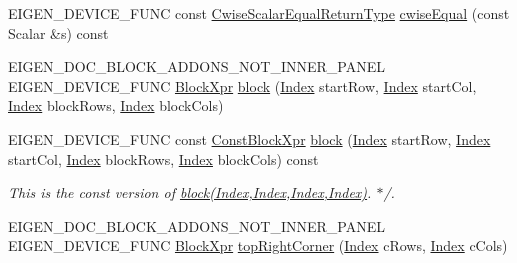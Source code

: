 \begin{DoxyCompactItemize}
\item 
E\+I\+G\+E\+N\+\_\+\+D\+E\+V\+I\+C\+E\+\_\+\+F\+U\+NC const \mbox{\hyperlink{class_eigen_1_1_cwise_binary_op}{Cwise\+Scalar\+Equal\+Return\+Type}} \mbox{\hyperlink{class_eigen_1_1_sparse_matrix_base_af1dcaa7c8574dbc2205319a91d798417}{cwise\+Equal}} (const Scalar \&s) const
\item 
E\+I\+G\+E\+N\+\_\+\+D\+O\+C\+\_\+\+B\+L\+O\+C\+K\+\_\+\+A\+D\+D\+O\+N\+S\+\_\+\+N\+O\+T\+\_\+\+I\+N\+N\+E\+R\+\_\+\+P\+A\+N\+EL E\+I\+G\+E\+N\+\_\+\+D\+E\+V\+I\+C\+E\+\_\+\+F\+U\+NC \mbox{\hyperlink{class_eigen_1_1_block}{Block\+Xpr}} \mbox{\hyperlink{class_eigen_1_1_sparse_matrix_base_a7c28a2f511181c727396d5e813519d38}{block}} (\mbox{\hyperlink{struct_eigen_1_1_eigen_base_a554f30542cc2316add4b1ea0a492ff02}{Index}} start\+Row, \mbox{\hyperlink{struct_eigen_1_1_eigen_base_a554f30542cc2316add4b1ea0a492ff02}{Index}} start\+Col, \mbox{\hyperlink{struct_eigen_1_1_eigen_base_a554f30542cc2316add4b1ea0a492ff02}{Index}} block\+Rows, \mbox{\hyperlink{struct_eigen_1_1_eigen_base_a554f30542cc2316add4b1ea0a492ff02}{Index}} block\+Cols)
\item 
\mbox{\label{class_eigen_1_1_sparse_matrix_base_a14f59422bfb2c1b27dcf5325e3a244d0}} 
E\+I\+G\+E\+N\+\_\+\+D\+E\+V\+I\+C\+E\+\_\+\+F\+U\+NC const \mbox{\hyperlink{class_eigen_1_1_block}{Const\+Block\+Xpr}} \mbox{\hyperlink{class_eigen_1_1_sparse_matrix_base_a14f59422bfb2c1b27dcf5325e3a244d0}{block}} (\mbox{\hyperlink{struct_eigen_1_1_eigen_base_a554f30542cc2316add4b1ea0a492ff02}{Index}} start\+Row, \mbox{\hyperlink{struct_eigen_1_1_eigen_base_a554f30542cc2316add4b1ea0a492ff02}{Index}} start\+Col, \mbox{\hyperlink{struct_eigen_1_1_eigen_base_a554f30542cc2316add4b1ea0a492ff02}{Index}} block\+Rows, \mbox{\hyperlink{struct_eigen_1_1_eigen_base_a554f30542cc2316add4b1ea0a492ff02}{Index}} block\+Cols) const
\begin{DoxyCompactList}\small\item\em This is the const version of \mbox{\hyperlink{class_eigen_1_1_sparse_matrix_base_a7c28a2f511181c727396d5e813519d38}{block(\+Index,\+Index,\+Index,\+Index)}}. $\ast$/. \end{DoxyCompactList}\item 
E\+I\+G\+E\+N\+\_\+\+D\+O\+C\+\_\+\+B\+L\+O\+C\+K\+\_\+\+A\+D\+D\+O\+N\+S\+\_\+\+N\+O\+T\+\_\+\+I\+N\+N\+E\+R\+\_\+\+P\+A\+N\+EL E\+I\+G\+E\+N\+\_\+\+D\+E\+V\+I\+C\+E\+\_\+\+F\+U\+NC \mbox{\hyperlink{class_eigen_1_1_block}{Block\+Xpr}} \mbox{\hyperlink{class_eigen_1_1_sparse_matrix_base_a709232ffb83f5c4c054de1c7655e8b99}{top\+Right\+Corner}} (\mbox{\hyperlink{struct_eigen_1_1_eigen_base_a554f30542cc2316add4b1ea0a492ff02}{Index}} c\+Rows, \mbox{\hyperlink{struct_eigen_1_1_eigen_base_a554f30542cc2316add4b1ea0a492ff02}{Index}} c\+Cols)

\end{DoxyCompactItemize}
